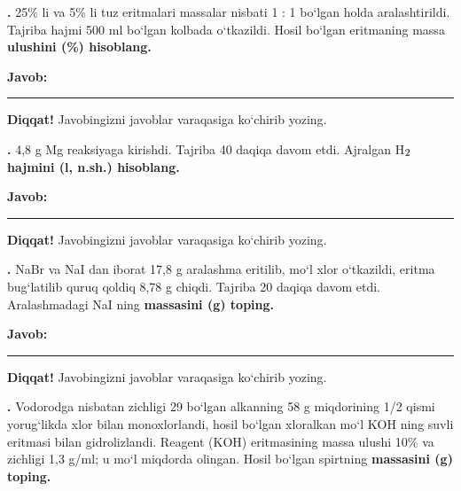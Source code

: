 \documentclass[11pt,a4paper]{article}
\renewcommand{\textsubscript}[1]{\ensuremath{_{\text{\fontsize{8}{8}\selectfont #1}}}}
\newcommand{\qn}[1]{\textbf{\fontsize{11.5}{13}\selectfont #1}}
\newcommand{\qsep}{\par\vspace{13pt}}
\newcommand{\javob}{\par\nopagebreak[4]\smallskip\noindent\textbf{Javob:} \rule[-2pt]{7.5cm}{0.4pt}\par\smallskip\noindent\textbf{Diqqat!} Javobingizni javoblar varaqasiga ko`chirib yozing.\par\medskip}
\begin{document}
\noindent\setlength{\fboxsep}{0pt}
\par\bigskip
\noindent\qn{36.} 25\% li va 5\% li tuz eritmalari massalar nisbati 1 : 1 bo`lgan holda aralashtirildi. Tajriba hajmi 500 ml bo`lgan kolbada o`tkazildi. Hosil bo`lgan eritmaning massa \textbf{ulushini (\%) hisoblang.}
\javob\qsep
\noindent\qn{37.} 4,8 g Mg reaksiyaga kirishdi. Tajriba 40 daqiqa davom etdi. Ajralgan H\textsubscript{2} \textbf{hajmini (l, n.sh.) hisoblang.}
\javob\qsep
\noindent\qn{38.} NaBr va NaI dan iborat 17,8 g aralashma eritilib, mo`l xlor o`tkazildi, eritma bug`latilib quruq qoldiq 8,78 g chiqdi. Tajriba 20 daqiqa davom etdi. Aralashmadagi NaI ning \textbf{massasini (g) toping.}
\javob\qsep
\noindent\qn{39.} Vodorodga nisbatan zichligi 29 bo`lgan alkanning 58 g miqdorining 1/2 qismi yorug`likda xlor bilan monoxlorlandi, hosil bo`lgan xloralkan mo`l KOH ning suvli eritmasi bilan gidrolizlandi. Reagent (KOH) eritmasining massa ulushi 10\% va zichligi 1,3 g/ml; u mo`l miqdorda olingan. Hosil bo`lgan spirtning \textbf{massasini (g) toping.}
\end{document}
